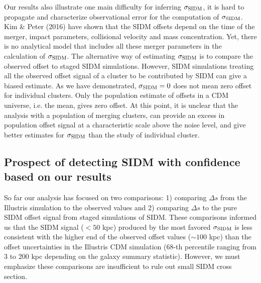 Our results also illustrate one main difficulty for inferring $\sigma_{\rm
SIDM}$, it is hard to propagate and characterize observational error  
for the computation of $\sigma_{\rm SIDM}$. Kim \& Peter (2016) have shown 
that the SIDM offsets depend on the time of the 
merger, impact parameters, collisional velocity and mass concentration. 
Yet, there is no analytical model that includes all these merger
parameters in the calculation of $\sigma_{\rm SIDM}$.  
The alternative way of estimating $\sigma_{\rm SIDM}$ is to compare the observed
offset to staged SIDM simulations.
However, SIDM simulations treating all the observed offset signal of a cluster 
to be contributed by SIDM can give a biased estimate.  
As we have demonstrated, $\sigma_{\rm SIDM} = 0$ does not mean zero offset for
individual clusters.  
Only the population estimate of offsets in a CDM universe, i.e. the mean,
gives zero offset.  
At this point, it is unclear that the analysis with a population of
merging clusters, can provide an excess in population offset signal at a
characteristic scale above the noise level, and give 
better estimates for $\sigma_{\rm
SIDM}$ than the study of individual cluster.  


\subsection{Prospect of detecting SIDM with confidence based on our results} 
\label{subsec:limitation_of_pvalue}
  
So far our analysis has focused on two comparisons: 1) comparing $\Delta s$ from
the Illustris simulation to the observed values and 2) comparing $\Delta s$ to  
the pure SIDM offset signal from staged simulations of SIDM. 
These comparisons informed us that the SIDM signal ($< 50$ kpc) produced by the most favored
$\sigma_{\rm SIDM}$ is less consistent with the higher end of the observed offset values ($\sim
100$ kpc) than the offset uncertainties in the Illustris CDM simulation (68-th 
percentile ranging from 3 to 200 kpc depending on the galaxy summary statistic).
However, we must emphasize these comparisons are
insufficient to rule out small SIDM cross section.  

